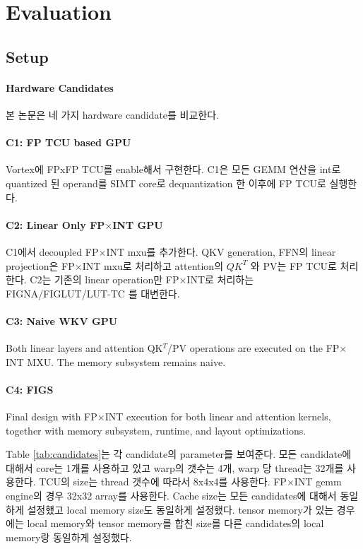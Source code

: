 \documentclass[11pt]{article}
\newcommand{\fpint}{FP$\times$INT}
\newcommand{\Cone}{FP TCU based GPU}
\newcommand{\Ctwo}{Linear Only FP$\times$INT GPU}
\newcommand{\Cthr}{Naive WKV GPU}
\newcommand{\Cfou}{FIGS}
\begin{document}
\section{Evaluation}

\subsection{Setup}

\paragraph{Hardware Candidates}
본 논문은 네 가지 hardware candidate를 비교한다.

\paragraph{C1: \Cone{}}
Vortex에 FPxFP TCU를 enable해서 구현한다. C1은 모든 GEMM 연산을 int로 quantized 된 operand를 SIMT core로 dequantization 한 이후에 FP TCU로 실행한다.

\paragraph{C2: \Ctwo{}}
C1에서 decoupled \fpint{} mxu를 추가한다. QKV generation, FFN의 linear projection은 \fpint{} mxu로 처리하고 attention의 $QK^T$ 와 PV는 FP TCU로 처리한다. C2는 기존의 linear operation만 \fpint{}로 처리하는 FIGNA/FIGLUT/LUT-TC 를 대변한다. 

\paragraph{C3: \Cthr{}}
Both linear layers and attention QK$^T$/PV operations are executed on the \fpint{} MXU. The memory subsystem remains naive.

\paragraph{C4: \Cfou{}}
Final design with \fpint{} execution for both linear and attention kernels, together with memory subsystem, runtime, and layout optimizations.

Table \ref{tab:candidates}는 각 candidate의 parameter를 보여준다. 모든 candidate에 대해서 core는 1개를 사용하고 있고 warp의 갯수는 4개, warp 당 thread는 32개를 사용한다. TCU의 size는 thread 갯수에 따라서 8x4x4를 사용한다. \fpint{} gemm engine의 경우 32x32 array를 사용한다. Cache size는 모든 candidates에 대해서 동일하게 설정했고 local memory size도 동일하게 설정했다. tensor memory가 있는 경우에는 local memory와 tensor memory를 합친 size를 다른 candidates의 local memory랑 동일하게 설정했다. 
\end{document}
